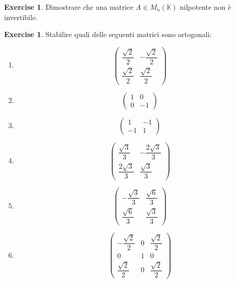 \documentclass{article}
\theoremstyle{plain}
\theoremstyle{definition}
\newtheorem{xca}[exmp]{Exercise}
\theoremstyle{remark}
\begin{document}
\begin{bxthm}
\begin{xca}
    Dimostrare che una matrice $A\in M_n(\mathbb{K})$ nilpotente non è invertibile.
\end{xca}
\end{bxthm}

\vspace{10pt}

\begin{bxthm}
\begin{xca}
    Stabilire quali delle seguenti matrici sono ortogonali:
    \begin{multicols}{2}
        \begin{enumerate}
            \item \[\begin{pmatrix}
                \dfrac{\sqrt{2}}{2} & -\dfrac{\sqrt{2}}{2} \\
                \dfrac{\sqrt{2}}{2} & \dfrac{\sqrt{2}}{2}
            \end{pmatrix}\]
            \item \[\begin{pmatrix}
                1&0\\
                0&-1
            \end{pmatrix}\]
            \item \[\begin{pmatrix}
                1&-1\\
                -1&1
            \end{pmatrix}\]
            \item \[\begin{pmatrix}
                \dfrac{\sqrt{3}}{3}&-\dfrac{2\sqrt{3}}{3}\\
                \dfrac{2\sqrt{3}}{3}&\dfrac{\sqrt{3}}{3}
            \end{pmatrix}\]
            \item \[\begin{pmatrix}
                -\dfrac{\sqrt{3}}{3}&\dfrac{\sqrt{6}}{3}\\
                \dfrac{\sqrt{6}}{3}&\dfrac{\sqrt{3}}{3}
            \end{pmatrix}\]
            \item \[\begin{pmatrix}
                -\dfrac{\sqrt{2}}{2}&0&\dfrac{\sqrt{2}}{2}\\
                0&1&0\\
                \dfrac{\sqrt{2}}{2}&0&\dfrac{\sqrt{2}}{2}

\end{pmatrix}\]
\end{enumerate}
\end{multicols}
\end{xca}
\end{bxthm}
\end{document}
